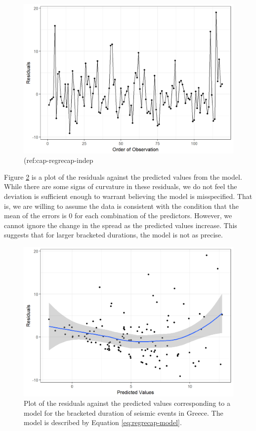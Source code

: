 \documentclass[]{book}
\theoremstyle{definition}
\theoremstyle{definition}
\theoremstyle{definition}
\theoremstyle{remark}
\begin{document}
\begin{figure}

{\centering \includegraphics[width=0.8\linewidth]{./Images/regrecap-indep-1} 

}

\caption{(ref:cap-regrecap-indep}\label{fig:regrecap-indep}
\end{figure}

Figure \ref{fig:regrecap-mean0} is a plot of the residuals against the
predicted values from the model. While there are some signs of curvature
in these residuals, we do not feel the deviation is sufficient enough to
warrant believing the model is misspecified. That is, we are willing to
assume the data is consistent with the condition that the mean of the
errors is 0 for each combination of the predictors. However, we cannot
ignore the change in the spread as the predicted values increase. This
suggests that for larger bracketed durations, the model is not as
precise.






\begin{figure}

{\centering \includegraphics[width=0.8\linewidth]{./Images/regrecap-mean0-1} 

}

\caption{Plot of the residuals against the predicted
values corresponding to a model for the bracketed duration of seismic
events in Greece. The model is described by Equation
\eqref{eq:regrecap-model}.}\label{fig:regrecap-mean0}
\end{figure}
\end{document}
